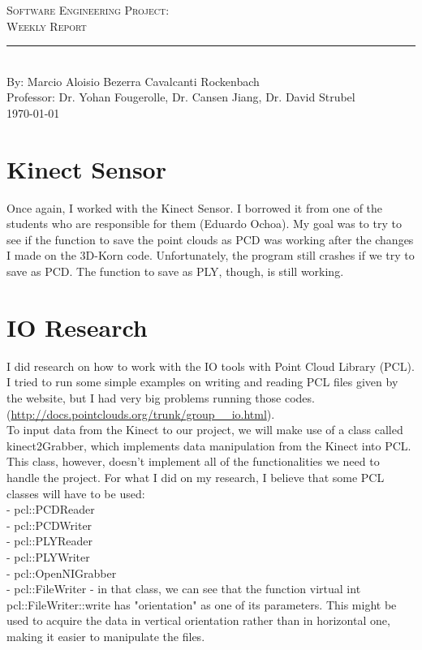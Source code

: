 \documentclass[aps,letterpaper,11pt]{revtex4}
\newcommand{\labno}{Software Engineering Project}
\newcommand{\labtitle}{Weekly Report}
\newcommand{\authorname}{Marcio Aloisio Bezerra Cavalcanti Rockenbach}
\newcommand{\professor}{Dr. Yohan Fougerolle, Dr. Cansen Jiang, Dr. David Strubel}
\begin{document}
  
\begin{titlepage}
\begin{center}
{\LARGE \textsc{\labno:} \\ \vspace{4pt}}
{\Large \textsc{\labtitle} \\ \vspace{4pt}} 
\rule[13pt]{\textwidth}{1pt} \\ \vspace{150pt}
{\large By: \authorname \\ \vspace{10pt}
Professor: \professor \\ \vspace{10pt}
\today}
\end{center}


\end{titlepage}%
\newpage
\setlength{\parindent}{5ex}

\section{Kinect Sensor}
Once again, I worked with the Kinect Sensor. I borrowed it from one of the students who are responsible for them (Eduardo Ochoa). My goal was to try to see if the function to save the point clouds as PCD was working after the changes I made on the 3D-Korn code. Unfortunately, the program still crashes if we try to save as PCD. The function to save as PLY, though, is still working.\\

\section{IO Research}
I did research on how to work with the IO tools with Point Cloud Library (PCL). I tried to run some simple examples on writing and reading PCL files given by the website, but I had very big problems running those codes. (\url{http://docs.pointclouds.org/trunk/group__io.html}).\\
\indent To input data from the Kinect to our project, we will make use of a class called kinect2Grabber, which implements data manipulation from the Kinect into PCL. This class, however, doesn't implement all of the functionalities we need to handle the project. For what I did on my research, I believe that some PCL classes will have to be used:\\
\indent - pcl::PCDReader\\
\indent - pcl::PCDWriter\\
\indent - pcl::PLYReader\\
\indent - pcl::PLYWriter\\
\indent - pcl::OpenNIGrabber\\
\indent - pcl::FileWriter - in that class, we can see that the function virtual int pcl::FileWriter::write has "orientation" as one of its parameters. This might be used to acquire the data in vertical orientation rather than in horizontal one, making it easier to manipulate the files.\\
\end{document}

